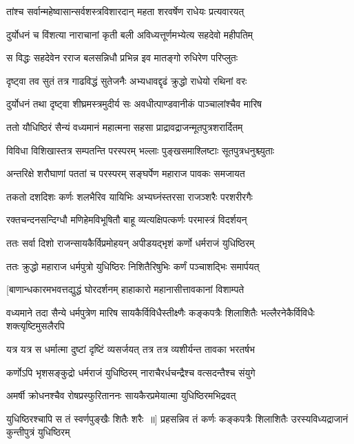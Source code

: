 \twolineshloka
{तांश्च सर्वान्महेष्वासान्सर्वशस्त्रविशारदान्}
{महता शरवर्षेण राधेयः प्रत्यवारयत्}


\twolineshloka
{दुर्योधनं च विंशत्या नाराचानां कृती बली}
{अविध्यत्तूर्णमभ्येत्य सहदेवो महीपतिम्}


\twolineshloka
{स विद्धः सहदेवेन रराज बलसन्निधौ}
{प्रभिन्न इव मातङ्गो रुधिरेण परिप्लुतः}


\twolineshloka
{दृष्ट्वा तव सुतं तत्र गाढविद्धं सुतेजनैः}
{अभ्यधावद्दृढं क्रुद्धो राधेयो रथिनां वरः}


\twolineshloka
{दुर्योधनं तथा दृष्ट्वा शीघ्रमस्त्रमुदीर्य सः}
{अवधीत्पाण्डवानीकं पाञ्चालांश्चैव मारिष}


\twolineshloka
{ततो यौधिष्ठिरं सैन्यं वध्यमानं महात्मना}
{सहसा प्राद्रावद्राजन्मूतपुत्रशरार्दितम्}


\twolineshloka
{विविधा विशिखास्तत्र सम्पतन्ति परस्परम्}
{भल्लाः पुङ्खसमाश्लिष्टाः सूतपुत्रधनुश्च्युताः}


\twolineshloka
{अन्तरिक्षे शरौघाणां पततां च परस्परम्}
{सङ्घर्पेण महाराज पावकः समजायत}


\twolineshloka
{तकतो दशदिशः कर्णः शलभैरिव यायिभिः}
{अभ्यघ्नंस्तरसा राजञ्शरैः परशरीरगैः}


\twolineshloka
{रक्तचन्दनसन्दिग्धौ मणिहेमविभूषितौ}
{बाहू व्यत्यक्षिपत्कर्णः परमास्त्रं विदर्शयन्}


\twolineshloka
{ततः सर्वा दिशो राजन्सायकैर्विप्रमोहयन्}
{अपीडयद्भृशं कर्णो धर्मराजं युधिष्ठिरम्}


\twolineshloka
{ततः क्रुद्धो महाराज धर्मपुत्रो युधिष्ठिरः}
{निशितैरिषुभिः कर्णं पञ्चाशद्भिः समार्पयत्}


\twolineshloka
{[बाणान्धकारमभवत्तद्युद्धं घोरदर्शनम्}
{हाहाकारो महानासीत्तावकानां विशाम्पते}


\threelineshloka
{वध्यमाने तदा सैन्ये धर्मपुत्रेण मारिष}
{सायकैर्विविधैस्तीक्ष्णैः कङ्कपत्रैः शिलाशितैः}
{भल्लैरनेकैर्विविधैः शक्त्यृष्टिमुसलैरपि}


\twolineshloka
{यत्र यत्र स धर्मात्मा दुष्टां दृष्टिं व्यसर्जयत्}
{तत्र तत्र व्यशीर्यन्त तावका भरतर्षभ}


\twolineshloka
{कर्णोऽपि भृशसङ्कुद्रो धर्मराजं युधिष्ठिरम्}
{नाराचैरर्धचन्द्रैश्च वत्सदन्तैश्च संयुगे}


\twolineshloka
{अमर्षी क्रोधनश्चैव रोषप्रस्फुरिताननः}
{सायकैरप्रमेयात्मा युधिष्ठिरमभिद्रवत्}


युधिष्ठिरश्चापि स तं स्वर्णपुङ्खैः शितैः शरैः ॥]
\twolineshloka
{प्रहसन्निव तं कर्णः कङ्कपत्रैः शिलाशितैः}
{उरस्यविध्यद्राजानं कुन्तीपुत्रं युधिष्ठिरम्}



